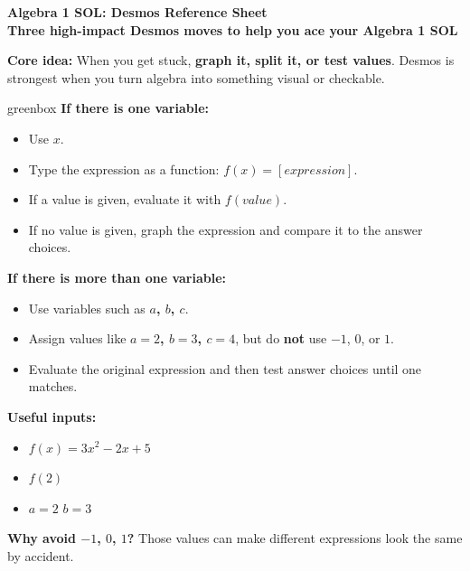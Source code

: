 \documentclass[14pt]{article}
\begin{document}
    \begin{center}
    {\Large\bfseries Algebra 1 SOL: Desmos Reference Sheet} \\
    {\small \bfseries Three high-impact Desmos moves to help you ace your Algebra 1 SOL}
    \end{center}
    
    \vspace{0.5em}
    \begin{tcolorbox}[colback=sky,colframe=navy,boxrule=0.9pt,arc=2mm,left=2mm,right=2mm,top=1.5mm,bottom=1.5mm]
        \textbf{Core idea:} When you get stuck, \textbf{graph it, split it, or test values}.
        Desmos is strongest when you turn algebra into something visual or checkable.
    \end{tcolorbox}

    \vspace{0.5em}

    \begin{skillbox}{greenbox}
        \textbf{If there is one variable:}
        \begin{itemize}
            \item Use \textbf{$x$}.
            \item Type the expression as a function: $f(x)= [expression]$.
            \item If a value is given, evaluate it with $f(value)$.
            \item If no value is given, graph the expression and compare it to the answer choices.
        \end{itemize}
        \textbf{If there is more than one variable:}
        \begin{itemize}
            \item Use variables such as \textbf{$a$, $b$, $c$}.
            \item Assign values like \textbf{$a=2$, $b=3$, $c=4$},
                    but do \textbf{not} use $-1$, $0$, or $1$.
            \item Evaluate the original expression and then test answer choices until one matches.
        \end{itemize}

        \textbf{Useful inputs:}
        \begin{itemize}
            \item \textbf{$ f(x)=3x^2-2x+5 $}
            \item \textbf{$ f(2) $}
            \item $a=2$ \hspace{1em} $b=3$
        \end{itemize}

        \textbf{Why avoid $-1$, $0$, $1$?} Those values can make different expressions look the same by accident.
    \end{skillbox}
\end{document}
